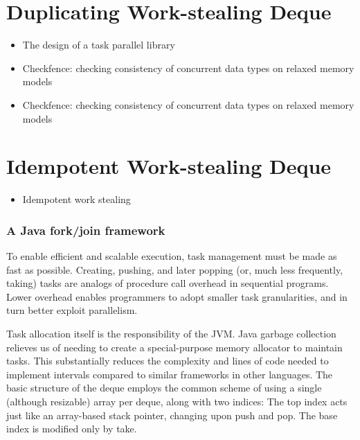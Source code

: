

\section{Duplicating Work-stealing Deque}
\label{sec:queues-implementation-duplicating-ws-deque}

\begin{itemize}
\item The design of a task parallel library \cite{Leijen2009}
\item Checkfence: checking consistency of concurrent data types on
  relaxed memory models \cite{Burckhardt2007}
\item Checkfence: checking consistency of concurrent data types on
  relaxed memory models \cite{Burckhardt2007a}
\end{itemize}



\section{Idempotent Work-stealing Deque}
\label{sec:queues-implementation-idempotent-ws-deque}

\begin{itemize}
\item Idempotent work stealing \cite{Michael2009}
\end{itemize}



\subsubsection{A Java fork/join framework \cite{Lea2000}}


To enable efficient and scalable execution, task management must be
made as fast as possible. Creating, pushing, and later popping (or,
much less frequently, taking) tasks are analogs of procedure call
overhead in sequential programs. Lower overhead enables programmers to
adopt smaller task granularities, and in turn better exploit
parallelism.

Task allocation itself is the responsibility of the JVM. Java garbage
collection relieves us of needing to create a special-purpose memory
allocator to maintain tasks. This substantially reduces the complexity
and lines of code needed to implement intervals compared to similar
frameworks in other languages. The basic structure of the deque
employs the common scheme of using a single (although resizable) array
per deque, along with two indices: The top index acts just like an
array-based stack pointer, changing upon push and pop. The base index
is modified only by take.

